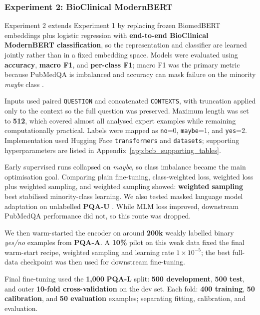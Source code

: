 \documentclass[11pt]{article}
\begin{document}
\subsubsection{Experiment 2: BioClinical ModernBERT}

Experiment 2 extends Experiment 1 by replacing frozen BiomedBERT embeddings plus logistic regression with \textbf{end-to-end BioClinical ModernBERT classification}, so the representation and classifier are learned jointly rather than in a fixed embedding space. Models were evaluated using \textbf{accuracy}, \textbf{macro F1}, and \textbf{per-class F1}; macro F1 was the primary metric because PubMedQA is imbalanced and accuracy can mask failure on the minority \textit{maybe} class \citep{younes_handling_2022}.

Inputs used paired \texttt{QUESTION} and concatenated \texttt{CONTEXTS}, with truncation applied only to the context so the full question was preserved. Maximum length was set to \textbf{512}, which covered almost all analysed expert examples while remaining computationally practical. Labels were mapped as \texttt{no}=0, \texttt{maybe}=1, and \texttt{yes}=2. Implementation used Hugging Face \texttt{transformers} and \texttt{datasets}; supporting hyperparameters are listed in Appendix~\ref{app:bcb_supporting_tables}.

Early supervised runs collapsed on \textit{maybe}, so class imbalance became the main optimisation goal. Comparing plain fine-tuning, class-weighted loss, weighted loss plus weighted sampling, and weighted sampling showed: \textbf{weighted sampling} best stabilised minority-class learning. We also tested masked language model adaptation on unlabelled \textbf{PQA-U} \citep{gururangan_dont_2020}. While MLM loss improved, downstream PubMedQA performance did not, so this route was dropped. 


We then warm-started the encoder on around \textbf{200k} weakly labelled binary \textit{yes/no} examples from \textbf{PQA-A}. A \textbf{10\%} pilot on this weak data fixed the final warm-start recipe, weighted sampling and learning rate \textbf{$1\times10^{-5}$}; the best full-data checkpoint was then used for downstream fine-tuning.

Final fine-tuning used the \textbf{1{,}000} \textbf{PQA-L} split: \textbf{500 development}, \textbf{500 test}, and outer \textbf{10-fold cross-validation} on the dev set. Each fold: \textbf{400 training}, \textbf{50 calibration}, and \textbf{50 evaluation} examples; separating fitting, calibration, and evaluation.
\end{document}
